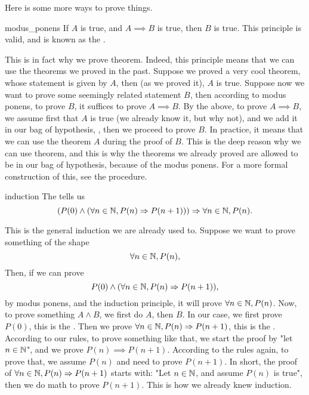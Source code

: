 Here is some more ways to prove things. 
\begin{cdef}{}{modus_ponens}
    If \( A \) is true, and \( A \implies B \) is true, then \( B \) is true. This principle is valid, and is known as the .
\end{cdef} 
This is in fact why we prove theorem. Indeed, this principle means that we can use the theorems we proved in the past. Suppose we proved a very cool theorem, whose statement is given by \( A \), then (as we proved it), \( A \) is true. Suppose now we want to prove some seemingly related statement \( B \), then according to modus ponens, to prove \( B \), it suffices to prove \( A \implies B \). By the above, to prove \( A \implies B \), we assume first that \( A \) is true (we already know it, but why not), and we add it in our bag of hypothesis, , then we proceed to prove \( B \). In practice, it means that we can use the theorem \( A \) during the proof of \( B \). This is the deep reason why we can use theorem, and this is why the theorems we already proved are allowed to be in our bag of hypothesis, because of the modus ponens. For a more formal construction of this, see the  procedure.  

\begin{cdef}{}{induction}
    The  tells us
    \begin{equation*}
        \left(P(0) \land (\forall n \in \mathbb{N}, P(n) \Rightarrow P(n+1)) \right) \Rightarrow \forall n \in \mathbb{N}, P(n).
    \end{equation*} 
\end{cdef}
This is the general induction we are already used to. Suppose we want to prove something of the shape
\begin{equation*}
    \forall n \in \mathbb{N}, P(n),
\end{equation*}
Then, if we can prove 
\begin{equation*}
    P(0) \land (\forall n \in \mathbb{N}, P(n) \Rightarrow P(n+1)),
\end{equation*}
by modus ponens, and the induction principle, it will prove \( \forall n \in \mathbb{N}, P(n) \). Now, to prove something \( A \land B \), we first do \( A \), then \( B \). In our case, we first prove \( P(0) \), this is the . Then we prove \( \forall n \in \mathbb{N}, P(n) \Rightarrow P(n+1) \), this is the . According to our rules, to prove something like that, we start the proof by "let \( n \in \mathbb{N} \)", and we prove \( P(n) \implies P(n+1) \). According to the rules again, to prove that, we assume \( P(n) \) and need to prove \( P(n + 1) \). In short, the proof of \( \forall n \in \mathbb{N}, P(n) \Rightarrow P(n+1) \) starts with:
"Let \( n \in \mathbb{N} \), and assume \( P(n) \) is true", then we do math to prove \( P(n+1) \). This is how we already knew induction.

